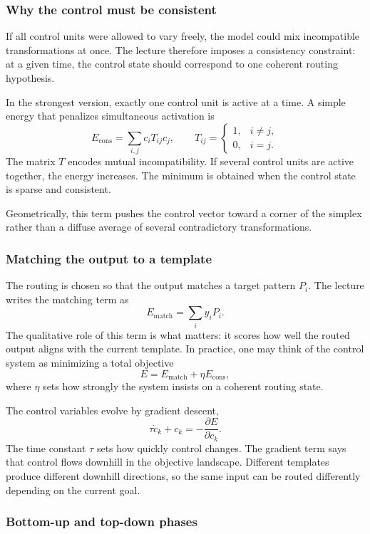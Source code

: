 \subsubsection{Why the control must be consistent}

If all control units were allowed to vary freely, the model could mix incompatible transformations at once. The lecture therefore imposes a consistency constraint: at a given time, the control state should correspond to one coherent routing hypothesis.

In the strongest version, exactly one control unit is active at a time. A simple energy that penalizes simultaneous activation is
\[
E_{\mathrm{cons}} = \sum_{i,j} c_i T_{ij} c_j,
\qquad
T_{ij}=
\begin{cases}
1, & i\neq j,\\
0, & i=j.
\end{cases}
\]
The matrix \(T\) encodes mutual incompatibility. If several control units are active together, the energy increases. The minimum is obtained when the control state is sparse and consistent.

Geometrically, this term pushes the control vector toward a corner of the simplex rather than a diffuse average of several contradictory transformations.

\subsubsection{Matching the output to a template}

The routing is chosen so that the output matches a target pattern \(P_i\). The lecture writes the matching term as
\[
E_{\mathrm{match}} = \sum_i y_i P_i.
\]
The qualitative role of this term is what matters: it scores how well the routed output aligns with the current template. In practice, one may think of the control system as minimizing a total objective
\[
E = E_{\mathrm{match}} + \eta E_{\mathrm{cons}},
\]
where \(\eta\) sets how strongly the system insists on a coherent routing state.

The control variables evolve by gradient descent,
\[
\tau \dot c_k + c_k = -\frac{\partial E}{\partial c_k}.
\]
The time constant \(\tau\) sets how quickly control changes. The gradient term says that control flows downhill in the objective landscape. Different templates produce different downhill directions, so the same input can be routed differently depending on the current goal.

\subsubsection{Bottom-up and top-down phases}

